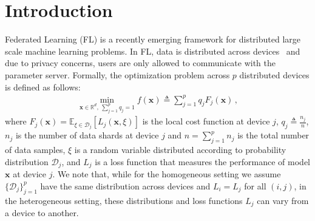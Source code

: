 \documentclass[twoside]{article}
\begin{document}
\vspace{-0.2in}
\section{Introduction}
\vspace{-0.05in}
Federated Learning (FL) is a recently emerging framework for distributed large scale machine learning problems.
In FL, data is distributed across devices~\cite{mcmahan2016communication,konevcny2016federated} and due to privacy concerns, users are only allowed to communicate with the parameter server.
Formally, the optimization problem across $p$ distributed devices is defined as follows:
\begin{align}\label{eq:main}
   \min_{\boldsymbol{x}\in \mathbb{R}^{d},\: \sum_{j=1}^pq_j=1} f(\boldsymbol{x})\triangleq \sum_{j=1}^{p}q_jF_j(\boldsymbol{x}) \, , 
\end{align}
where $F_j(\boldsymbol{x})=\mathbb{E}_{\xi\in\mathcal{D}_j}\left[L_j\left(\boldsymbol{x},\xi\right)\right]$ is the local cost function at device $j$, $q_j\triangleq\frac{n_j}{n}$, $n_j$ is the number of data shards at device $j$ and $n=\sum_{j=1}^pn_j$ is the total number of data samples,
$\xi$ is a random variable distributed according to probability distribution $\mathcal{D}_j$, and $L_j$ is a loss function that measures the performance of model $\boldsymbol{x}$ at device $j$. 
We note that, while for the homogeneous setting we assume $\{\mathcal{D}_j\}_{j=1}^p$ have the same distribution across devices and $L_i=L_j$ for all $(i,j)$, in the heterogeneous setting, these distributions and loss functions $L_j$ can vary from a device to another. 
\end{document}
